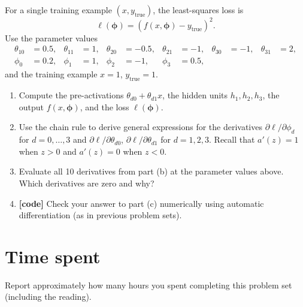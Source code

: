 \documentclass[letterpaper]{article}
\begin{document}
For a single training example $(x, y_\text{true})$, the least-squares loss is
\[
  \ell(\bm{\phi}) = \left( f(x, \bm{\phi}) - y_\text{true} \right)^2.
\]
Use the parameter values
\begin{align*}
  \theta_{10} &= 0.5, & \theta_{11} &= 1, & \theta_{20} &= -0.5, & \theta_{21} &= -1, & \theta_{30} &= -1, & \theta_{31} &= 2, \\
  \phi_0 &= 0.2, & \phi_1 &= 1, & \phi_2 &= -1, & \phi_3 &= 0.5,
\end{align*}
and the training example $x = 1$, $y_\text{true} = 1$.
\begin{enumerate}
\item Compute the pre-activations $\theta_{d0} + \theta_{d1} x$, the hidden units $h_1, h_2, h_3$, the output $f(x, \bm{\phi})$, and the loss $\ell(\bm{\phi})$.
\item Use the chain rule to derive general expressions for the derivatives $\partial \ell / \partial \phi_d$ for $d = 0, \ldots, 3$ and $\partial \ell / \partial \theta_{d0}$, $\partial \ell / \partial \theta_{d1}$ for $d = 1, 2, 3$. Recall that $a'(z) = 1$ when $z > 0$ and $a'(z) = 0$ when $z < 0$.
\item Evaluate all 10 derivatives from part (b) at the parameter values above. Which derivatives are zero and why?
\item \textbf{[code]} Check your answer to part (c) numerically using automatic differentiation (as in previous problem sets).
\end{enumerate}

\section*{Time spent}

Report approximately how many hours you spent completing this problem set (including the reading).
\end{document}
